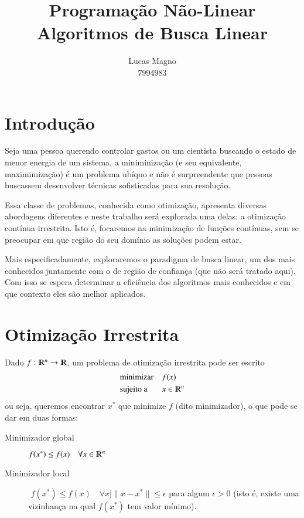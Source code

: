 \documentclass[a4paper,11pt]{article}
\date{}
\author{Lucas Magno \\ 7994983}
\title{Programação Não-Linear \\ Algoritmos de Busca Linear}
\begin{document}
    \maketitle

    \section*{Introdução}
        Seja uma pessoa querendo controlar gastos ou um cientista buscando o estado de menor energia de um sistema, a miniminização (e seu equivalente, maximimização) é um problema ubíquo e não é surpreendente que pessoas buscassem desenvolver técnicas sofisticadas para sua resolução.

        Essa classe de problemas, conhecida como otimização, apresenta diversas abordagens diferentes e neste trabalho será explorada uma delas: a otimização contínua irrestrita.
        Isto é, focaremos na minimização de funções contínuas, sem se preocupar em que região do seu domínio as soluções podem estar.

        Mais especificadamente, exploraremos o paradigma de busca linear, um dos mais conhecidos juntamente com o de região de confiança (que não será tratado aqui).
        Com isso se espera determinar a eficiência dos algoritmos mais conhecidos e em que contexto eles são melhor aplicados.

    \section*{Otimização Irrestrita}
        Dado $f: \varmathbb{R}^n \rightarrow \varmathbb{R}$, um problema de
        otimização irrestrita pode ser escrito
        \begin{equation*}
            \begin{aligned}
                & \text{minimizar} & & f(x) \\
                & \text{sujeito a} & & x \in \varmathbb{R}^n \\
            \end{aligned}
        \end{equation*}
        ou seja, queremos encontrar $x^*$ que minimize $f$ (dito minimizador), o que pode se dar em duas formas:
        \begin{description}
            \item [Minimizador global] $f(x^*) \leq f(x) \quad  \forall x \in \varmathbb{R}^n$
            \item [Minimizador local]  $\,\,f(x^*) \leq f(x) \quad  \forall x \mid \|x - x^*\| \leq \epsilon$
                    para algum $\epsilon > 0$ (isto é, existe uma vizinhança na qual $f(x^*)$ tem valor mínimo).
        \end{description}
\end{document}

